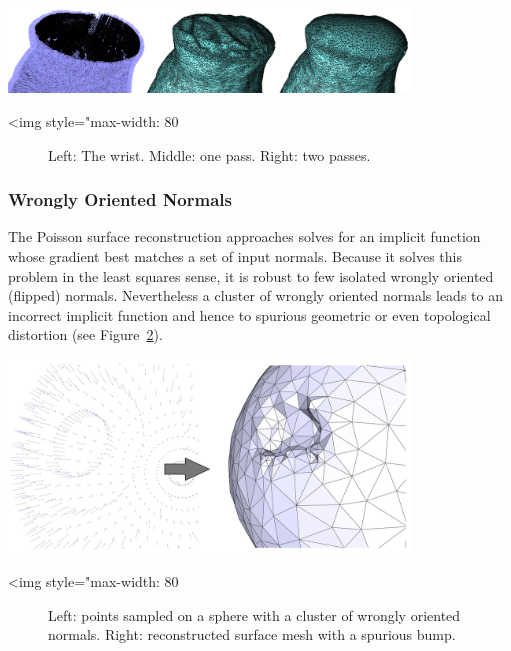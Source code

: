 \begin{center}
    \begin{ccTexOnly}
        \includegraphics[width=0.8\textwidth]{Surface_reconstruction_points_3/fig/two-passes.png}
    \end{ccTexOnly}
    \begin{ccHtmlOnly}
        <img style="max-width: 80%
    \end{ccHtmlOnly}
    \begin{figure}[h]
        \caption{Left: The wrist. Middle: one pass. Right: two passes.}
        \label{Surface_reconstruction_points_3-fig-two_passes}
    \end{figure}
\end{center}


\subsubsection{Wrongly Oriented Normals}

The Poisson surface reconstruction approaches solves for an implicit function whose gradient best matches a set of input normals. Because it solves this problem in the least squares sense, it is robust to few isolated wrongly oriented (flipped) normals. Nevertheless a cluster of wrongly oriented normals leads to an incorrect implicit function and hence to spurious geometric or even topological distortion (see Figure~\ref{Surface_reconstruction_points_3-fig-flipped_normals}).

\begin{center}
    \begin{ccTexOnly}
        \includegraphics[width=0.8\textwidth]{Surface_reconstruction_points_3/flipped_normals}
    \end{ccTexOnly}
    \begin{ccHtmlOnly}
        <img style="max-width: 80%
    \end{ccHtmlOnly}
    \begin{figure}[h]
        \caption{Left: points sampled on a sphere with a cluster
                 of wrongly oriented normals.
                 Right: reconstructed surface mesh with a spurious bump.}
        \label{Surface_reconstruction_points_3-fig-flipped_normals}
    \end{figure}
\end{center}



